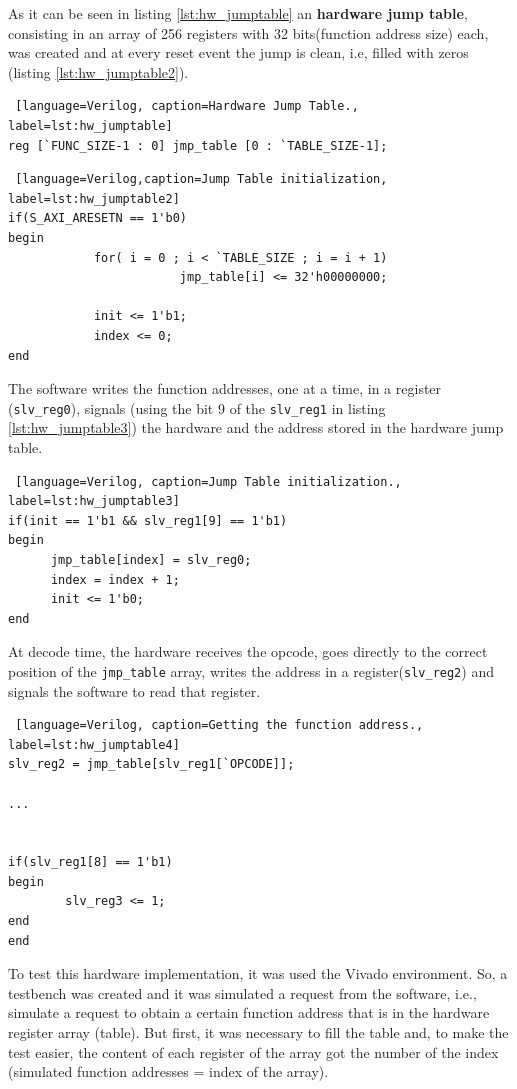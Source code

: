 \documentclass[12pt]{article}
\newcounter{subsubsubsection}[subsubsection]
\begin{document}
{As it can be seen in listing \ref{lst:hw_jumptable} an \textbf{hardware jump table}, consisting in an array of 256 registers with 32 bits(function address size) each, was created and at every reset event the jump is clean, i.e, filled with zeros (listing \ref{lst:hw_jumptable2}).

\begin{lstlisting} [language=Verilog, caption=Hardware Jump Table., label=lst:hw_jumptable]
reg [`FUNC_SIZE-1 : 0] jmp_table [0 : `TABLE_SIZE-1];
\end{lstlisting}

\begin{lstlisting} [language=Verilog,caption=Jump Table initialization, label=lst:hw_jumptable2]
if(S_AXI_ARESETN == 1'b0)
begin
			for( i = 0 ; i < `TABLE_SIZE ; i = i + 1)
						jmp_table[i] <= 32'h00000000;

			init <= 1'b1;
			index <= 0;         
end
\end{lstlisting}

The software writes the function addresses, one at a time, in a register (\texttt{slv\_reg0}), signals (using the bit 9 of the \texttt{slv\_reg1} in listing \ref{lst:hw_jumptable3}) the hardware and the address stored in the hardware jump table.

\begin{lstlisting} [language=Verilog, caption=Jump Table initialization., label=lst:hw_jumptable3]
if(init == 1'b1 && slv_reg1[9] == 1'b1)
begin
      jmp_table[index] = slv_reg0;
      index = index + 1;
      init <= 1'b0; 
end
\end{lstlisting}

At decode time, the hardware receives the opcode, goes directly to the correct position of the \texttt{jmp\_table} array, writes the address in a register(\texttt{slv\_reg2}) and signals the software to read that register.

\begin{lstlisting} [language=Verilog, caption=Getting the function address., label=lst:hw_jumptable4]
slv_reg2 = jmp_table[slv_reg1[`OPCODE]];

...


if(slv_reg1[8] == 1'b1)
begin           
		slv_reg3 <= 1; 
end
end
\end{lstlisting}


To test this hardware implementation, it was used the Vivado environment. So, a testbench was created and it was simulated a request from the software, i.e., simulate a request to obtain a certain function address that is in the hardware register array (table). But first, it was necessary to fill the table and, to make the test easier, the content of each register of the array got the number of the index (simulated function addresses = index of the array).

}
\end{document}
